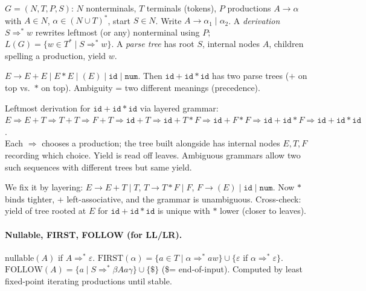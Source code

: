 \begin{definition}[CFG]
$G=(N,T,P,S)$: $N$ nonterminals, $T$ terminals (tokens), $P$ productions $A\to\alpha$ with $A\in N$, $\alpha\in(N\cup T)^*$, start $S\in N$. Write $A\to\alpha_1\mid\alpha_2$. A \emph{derivation} $S\Rightarrow^*\! w$ rewrites leftmost (or any) nonterminal using $P$; $L(G)=\{w\in T^*\mid S\Rightarrow^*w\}$. A \emph{parse tree} has root $S$, internal nodes $A$, children spelling a production, yield $w$.
\end{definition}

\begin{example}
$E\to E+E\mid E*E\mid (E)\mid \texttt{id}\mid\texttt{num}$. Then $ \texttt{id}+\texttt{id}*\texttt{id}$ has two parse trees ($+$ on top vs.\ $*$ on top). Ambiguity = two different meanings (precedence).
\end{example}

\begin{example}
Leftmost derivation for $\texttt{id}+\texttt{id}*\texttt{id}$ via layered grammar:\\
$E\Rightarrow E+T\Rightarrow T+T\Rightarrow F+T\Rightarrow \texttt{id}+T\Rightarrow \texttt{id}+T*F\Rightarrow \texttt{id}+F*F\Rightarrow \texttt{id}+\texttt{id}*F\Rightarrow \texttt{id}+\texttt{id}*\texttt{id}$.\\
Each $\Rightarrow$ chooses a production; the tree built alongside has internal nodes $E,T,F$ recording which choice. Yield is read off leaves. Ambiguous grammars allow two such sequences with different trees but same yield.
\end{example}

We fix it by layering: $E\to E+T\mid T$, $T\to T*F\mid F$, $F\to (E)\mid \texttt{id}\mid\texttt{num}$. Now $*$ binds tighter, $+$ left-associative, and the grammar is unambiguous. Cross-check: yield of tree rooted at $E$ for $\texttt{id}+\texttt{id}*\texttt{id}$ is unique with $*$ lower (closer to leaves).

\paragraph{Nullable, FIRST, FOLLOW (for LL/LR).}
$\text{nullable}(A)$ if $A\Rightarrow^*\varepsilon$. $\text{FIRST}(\alpha)=\{a\in T\mid\alpha\Rightarrow^*aw\}\cup\{\varepsilon$ if $\alpha\Rightarrow^*\varepsilon\}$. $\text{FOLLOW}(A)=\{a\mid S\Rightarrow^*\beta A a\gamma\}\cup\{\$\}$ (\$$ $= end-of-input). Computed by least fixed-point iterating productions until stable.

